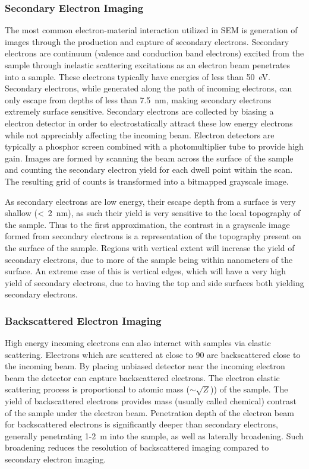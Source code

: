 \subsubsection{Secondary Electron Imaging} The most common electron-material interaction utilized in SEM is generation of images through the production and capture of secondary electrons.
Secondary electrons are continuum (valence and conduction band electrons) excited from the sample through inelastic scattering excitations as an electron beam penetrates into a sample.
These electrons typically have energies of less than 50~eV\cite{goldstein2003scanning}.
Secondary electrons, while generated along the path of incoming electrons, can only escape from depths of less than 7.5~nm, making secondary electrons extremely surface sensitive\cite{goldstein2003scanning}.
Secondary electrons are collected by biasing a electron detector in order to electrostatically attract these low energy electrons while not appreciably affecting the incoming beam.
Electron detectors are typically a phosphor screen combined with a photomultiplier tube to provide high gain.
Images are formed by scanning the beam across the surface of the sample and counting the secondary electron yield for each dwell point within the scan.
The resulting grid of counts is transformed into a bitmapped grayscale image.

As secondary electrons are low energy, their escape depth from a surface is very shallow (<~2~nm), as such their yield is very sensitive to the local topography of the sample.
Thus to the first approximation, the contrast in a grayscale image formed from secondary electrons is a representation of the topography present on the surface of the sample.
Regions with vertical extent will increase the yield of secondary electrons, due to more of the sample being within nanometers of the surface.
An extreme case of this is vertical edges, which will have a very high yield of secondary electrons, due to having the top and side surfaces both yielding secondary electrons.

\subsubsection{Backscattered Electron Imaging} High energy incoming electrons can also interact with samples via elastic scattering.
Electrons which are scattered at close to 90\degree{} are backscattered close to the incoming beam.
By placing unbiased detector near the incoming electron beam the detector can capture backscattered electrons.
The electron elastic scattering process is proportional to atomic mass (\(\sim\)\(\sqrt{Z}\))) of the sample.
The yield of backscattered electrons provides mass (usually called chemical) contrast of the sample under the electron beam.
Penetration depth of the electron beam for backscattered electrons is significantly deeper than secondary electrons, generally penetrating 1-2~\micro{}m into the sample, as well as laterally broadening.
Such broadening reduces the resolution of backscattered imaging compared to secondary electron imaging.

